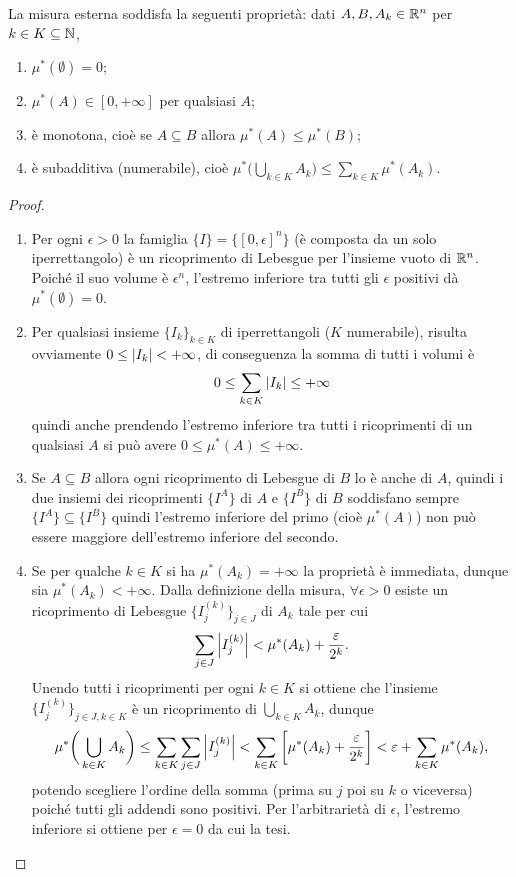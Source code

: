 \begin{proprieta} \label{pr:misura-esterna}
	La misura esterna soddisfa la seguenti proprietà: dati $A,B,A_k\in\mathbb{R}^n$ per $k\in K\subseteq\mathbb{N}$,
	\begin{enumerate}
		\item $\mu^*(\emptyset)=0$;
		\item $\mu^*(A)\in[0,+\infty]$ per qualsiasi $A$;
		\item è monotona, cioè se $A\subseteq B$ allora $\mu^*(A)\leq\mu^*(B)$;
		\item è subadditiva (numerabile), cioè $\mu^*\big(\bigcup_{k\in K}A_k\big)\leq\sum_{k\in K}\mu^*(A_k)$.
	\end{enumerate}
\end{proprieta}
\begin{proof}
	\begin{enumerate}
		\item Per ogni $\epsilon>0$ la famiglia $\{I\}=\{[0,\epsilon]^n\}$ (è composta da un solo iperrettangolo) è un ricoprimento di Lebesgue per l'insieme vuoto di $\mathbb{R}^n$.
			Poich\'e il suo volume è $\epsilon^n$, l'estremo inferiore tra tutti gli $\epsilon$ positivi dà $\mu^*(\emptyset)=0$.
		\item Per qualsiasi insieme $\{I_k\}_{k\in K}$ di iperrettangoli ($K$ numerabile), risulta ovviamente $0\leq\left|{I_k}\right|<+\infty$, di conseguenza la somma di tutti i volumi è
			\begin{equation}
				0\leq\sum_{k\in K}\left|{I_k}\right|\leq+\infty
			\end{equation}
			quindi anche prendendo l'estremo inferiore tra tutti i ricoprimenti di un qualsiasi $A$ si può avere $0\leq\mu^*(A)\leq+\infty$.
		\item Se $A\subseteq B$ allora ogni ricoprimento di Lebesgue di $B$ lo è anche di $A$, quindi i due insiemi dei ricoprimenti $\{I^A\}$ di $A$ e $\{I^B\}$ di $B$ soddisfano sempre $\{I^A\}\subseteq\{I^B\}$ quindi l'estremo inferiore del primo (cioè $\mu^*(A)$) non può essere maggiore dell'estremo inferiore del secondo.
		\item Se per qualche $k\in K$ si ha $\mu^*(A_k)=+\infty$ la proprietà è immediata, dunque sia $\mu^*(A_k)<+\infty$.
			Dalla definizione della misura, $\forall\epsilon>0$ esiste un ricoprimento di Lebesgue $\{I^{(k)}_j\}_{j\in J}$ di $A_k$ tale per cui
			\begin{equation}
				\sum_{j\in J}\left|{I^{(k)}_j}\right|<\mu^*(A_k)+\frac{\varepsilon}{2^k}.
			\end{equation}
			Unendo tutti i ricoprimenti per ogni $k\in K$ si ottiene che l'insieme $\{I^{(k)}_j\}_{j\in J,k\in K}$ è un ricoprimento di $\bigcup_{k\in K}A_k$, dunque
			\begin{equation}
				\mu^*\bigg(\bigcup_{k\in K}A_k\bigg)\leq\sum_{k\in K}\sum_{j\in J}\left|{I^{(k)}_j}\right|<\sum_{k\in K}\bigg[\mu^*(A_k)+\frac{\varepsilon}{2^k}\bigg]<\varepsilon+\sum_{k\in K}\mu^*(A_k),
			\end{equation}
			potendo scegliere l'ordine della somma (prima su $j$ poi su $k$ o viceversa) poich\'e tutti gli addendi sono positivi.
			Per l'arbitrarietà di $\epsilon$, l'estremo inferiore si ottiene per $\epsilon=0$ da cui la tesi.\qedhere
	\end{enumerate}
\end{proof}
